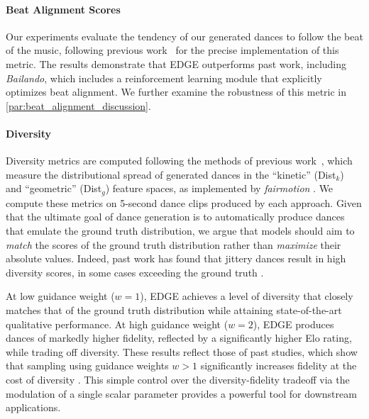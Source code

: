 \documentclass[10pt,twocolumn,letterpaper]{article}
\begin{document}
\vspace{-10pt}
\paragraph{Beat Alignment Scores}

Our experiments evaluate the tendency of our generated dances to follow the beat of the music, following previous work~\cite{siyao2022bailando} for the precise implementation of this metric.
The results demonstrate that EDGE outperforms past work, including \textit{Bailando}, which includes a reinforcement learning module that explicitly optimizes beat alignment.
We further examine the robustness of this metric in \cref{par:beat_alignment_discussion}.
\vspace{-10pt}
\paragraph{Diversity}

Diversity metrics are computed following the methods of previous work~\cite{li2021ai,siyao2022bailando}, which measure the distributional spread of generated dances in the ``kinetic'' (Dist$_k$) and ``geometric'' (Dist$_g$) feature spaces, as implemented by \textit{fairmotion} \cite{gopinath2020fairmotion, muller2005efficient, onuma2008fmdistance}.
We compute these metrics on 5-second dance clips produced by each approach.
Given that the ultimate goal of dance generation is to automatically produce dances that emulate the ground truth distribution, we argue that models should aim to \emph{match} the scores of the ground truth distribution rather than \emph{maximize} their absolute values.
Indeed, past work has found that jittery dances result in high diversity scores, in some cases exceeding the ground truth \cite{li2020learning, li2021ai}.

At low guidance weight ($w=1$), EDGE achieves a level of diversity that closely matches that of the ground truth distribution while attaining state-of-the-art qualitative performance.
At high guidance weight ($w=2$), EDGE produces dances of markedly higher fidelity, reflected by a significantly higher Elo rating, while trading off diversity.
These results reflect those of past studies, which show that sampling using guidance weights $w > 1$ significantly increases fidelity at the cost of diversity \cite{ho2022classifier, saharia2022photorealistic}.
This simple control over the diversity-fidelity tradeoff via the modulation of a single scalar parameter provides a powerful tool for downstream applications.
\end{document}
